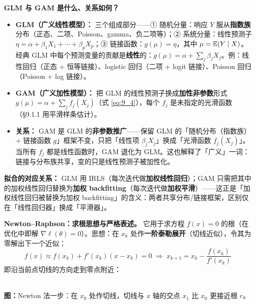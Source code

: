 \textbf{GLM 与 GAM 是什么、关系如何？}
\begin{itemize}
    \item \textbf{GLM（广义线性模型）：} 三个组成部分——① 随机分量：响应 $Y$ 服从\textbf{指数族}分布（正态、二项、Poisson、gamma、负二项等）；② 系统分量：线性预测子 $\eta = \alpha + \beta_1 X_1 + \cdots + \beta_p X_p$；③ 链接函数：$g(\mu) = \eta$，其中 $\mu = \mathbb{E}(Y \mid X)$。经典 GLM 中每个预测变量的贡献是\textbf{线性}的：$g(\mu) = \alpha + \sum_j \beta_j X_j$。例：线性回归（正态 + 恒等链接）、logistic 回归（二项 + logit 链接）、Poisson 回归（Poisson + log 链接）。
    \item \textbf{GAM（广义加性模型）：} 把 GLM 的线性预测子换成\textbf{加性非参数}形式 $g(\mu) = \alpha + \sum_j f_j(X_j)$（式 \eqref{eq:9_4}），每个 $f_j$ 是未指定的光滑函数（§9.1.1 用平滑样条估计）。
    \item \textbf{关系：} GAM 是 GLM 的\textbf{非参数推广}——保留 GLM 的「随机分布（指数族）+ 链接函数 $g$」框架不变，只把「线性项 $\beta_j X_j$」换成「光滑函数 $f_j(X_j)$」。当所有 $f_j$ 都是线性函数时，GAM 退化为 GLM。这也解释了「广义」一词：链接与分布族共享，变的只是线性预测子被加性化。
\end{itemize}
\textbf{拟合的对应关系：} GLM 用 IRLS（每次迭代做\textbf{加权线性回归}）；GAM 只需把其中的加权线性回归替换为\textbf{加权 backfitting}（每次迭代做\textbf{加权平滑}）——这正是「加权线性回归被替换为加权 backfitting」的含义：两者共享分布/链接框架，区别仅在「线性回归器」换成「平滑器」。

\textbf{Newton--Raphson：求根思想与严格表述。} 它用于求方程 $f(x) = 0$ 的根（在优化中即解 $\nabla\ell(\theta) = 0$）。思想：在 $x_k$ 处作\textbf{一阶泰勒展开}（切线近似），令其为零解出下一个近似：
\[
    f(x) \approx f(x_k) + f'(x_k)(x - x_k) = 0
    \;\Longrightarrow\;
    x_{k+1} = x_k - \frac{f(x_k)}{f'(x_k)}
\]
即沿当前点切线的方向走到零点附近：

\begin{center}
\\[2pt]
\small\textbf{图：}Newton 法一步：在 $x_0$ 处作切线，切线与 $x$ 轴的交点 $x_1$ 比 $x_0$ 更接近根 $r$。
\end{center}

